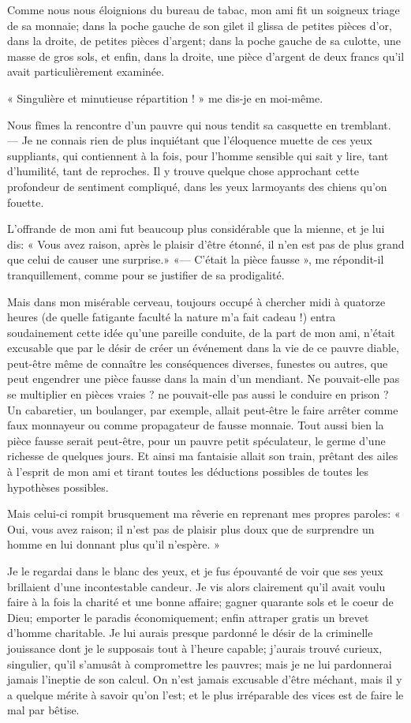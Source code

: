 Comme nous nous éloignions du bureau de tabac, mon ami fit un soigneux
triage de sa monnaie; dans la poche gauche de son gilet il glissa de
petites pièces d’or, dans la droite, de petites pièces
d’argent; dans la poche gauche de sa culotte, une
masse de gros sols, et enfin, dans la droite, une pièce
d’argent de deux francs qu’il avait
particulièrement examinée.

« Singulière et minutieuse répartition ! » me dis{}-je en moi{}-même.

Nous fîmes la rencontre d’un pauvre qui nous tendit sa
casquette en tremblant. --- Je ne connais rien de plus inquiétant que
l’éloquence muette de ces yeux suppliants, qui
contiennent à la fois, pour l’homme sensible qui sait
y lire, tant d’humilité, tant de reproches. Il y
trouve quelque chose approchant cette profondeur de sentiment
compliqué, dans les yeux larmoyants des chiens qu’on
fouette.

L’offrande de mon ami fut beaucoup plus considérable
que la mienne, et je lui dis: « Vous avez raison, après le plaisir
d’être étonné, il n’en est pas de
plus grand que celui de causer une surprise.» «---
C’était la pièce fausse », me répondit{}-il
tranquillement, comme pour se justifier de sa prodigalité.

Mais dans mon misérable cerveau, toujours occupé à chercher midi à
quatorze heures (de quelle fatigante faculté la nature
m’a fait cadeau !) entra soudainement cette idée
qu’une pareille conduite, de la part de mon ami,
n’était excusable que par le désir de créer un
événement dans la vie de ce pauvre diable, peut{}-être même de
connaître les conséquences diverses, funestes ou autres, que peut
engendrer une pièce fausse dans la main d’un mendiant.
Ne pouvait{}-elle pas se multiplier en pièces vraies ? ne
pouvait{}-elle pas aussi le conduire en prison ? Un cabaretier, un
boulanger, par exemple, allait peut{}-être le faire arrêter comme faux
monnayeur ou comme propagateur de fausse monnaie. Tout aussi bien la
pièce fausse serait peut{}-être, pour un pauvre petit spéculateur, le
germe d’une richesse de quelques jours. Et ainsi ma
fantaisie allait son train, prêtant des ailes à
l’esprit de mon ami et tirant toutes les déductions
possibles de toutes les hypothèses possibles.

Mais celui{}-ci rompit brusquement ma rêverie en reprenant mes propres
paroles: « Oui, vous avez raison; il n’est pas de
plaisir plus doux que de surprendre un homme en lui donnant plus
qu’il n’espère. »

Je le regardai dans le blanc des yeux, et je fus épouvanté de voir que
ses yeux brillaient d’une incontestable candeur. Je
vis alors clairement qu’il avait voulu faire à la fois
la charité et une bonne affaire; gagner quarante sols et le coeur de
Dieu; emporter le paradis économiquement; enfin attraper gratis un
brevet d’homme charitable. Je lui aurais presque
pardonné le désir de la criminelle jouissance dont je le supposais tout
à l’heure capable; j’aurais trouvé
curieux, singulier, qu’il s’amusât à
compromettre les pauvres; mais je ne lui pardonnerai jamais
l’ineptie de son calcul. On n’est
jamais excusable d’être méchant, mais il y a quelque
mérite à savoir qu’on l’est; et le
plus irréparable des vices est de faire le mal par bêtise.

